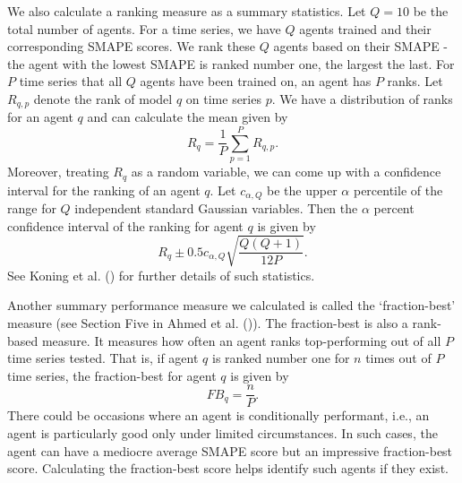 We also calculate a ranking measure as a summary statistics. Let $Q=10$ be the total number of agents. For a time series, we have $Q$ agents trained and their corresponding SMAPE scores. We rank these $Q$ agents based on their SMAPE - the agent with the lowest SMAPE is ranked number one, the largest the last. For $P$ time series that all $Q$ agents have been trained on, an agent has $P$ ranks. Let $R_{q, p}$ denote the rank of model $q$ on time series $p$. We have a distribution of ranks for an agent $q$ and can calculate the mean given by
\begin{equation*}\label{eq: rank}
    R_q = \frac{1}{P} \sum_{p = 1}^{P}R_{q, p}.
\end{equation*}
Moreover, treating $R_q$ as a random variable, we can come up with a confidence interval for the ranking of an agent $q$. Let $c_{\alpha, Q}$ be the upper $\alpha$ percentile of the range for $Q$ independent standard Gaussian variables. Then the $\alpha$ percent confidence interval of the ranking for agent $q$ is given by
\begin{equation*}\label{eq: rank interval}
    R_q \pm 0.5 c_{\alpha, Q} \sqrt{\frac{Q(Q+1)}{12 P}}.
\end{equation*}
See Koning et al. (\citeyear{KONING2005397}) for further details of such statistics.

Another summary performance measure we calculated is called the `fraction-best' measure (see Section Five in Ahmed et al. (\citeyear{2010EmpiricalMLComparison})). The fraction-best is also a rank-based measure. It measures how often an agent ranks top-performing out of all $P$ time series tested. That is, if agent $q$ is ranked number one for $n$ times out of $P$ time series, the fraction-best for agent $q$ is given by
\begin{equation*}\label{eq: frac best}
    FB_q = \frac{n}{P}.
\end{equation*}
There could be occasions where an agent is conditionally performant, i.e., an agent is particularly good only under limited circumstances. In such cases, the agent can have a mediocre average SMAPE score but an impressive fraction-best score. Calculating the fraction-best score helps identify such agents if they exist.

